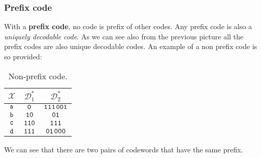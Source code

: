 \subsubsection{Prefix code}
With a \textbf{prefix code}, no code is prefix of other codes. Any prefix code is also a \textit{uniquely decodable code}.
As we can see also from the previous picture all the prefix codes are also unique decodable codes.
An example of a non prefix code is so provided:
\begin{table}[H]
	\centering
	\begin{tabular}{| c | c | c |}
		\hline
		$\mathcal{X}$ & $\mathcal{D}^*_1$ & $\mathcal{D}^*_2$\\\hline
		$\verb|a|$ & $\verb|0|$ & {\color{red}$\verb|111|$}$\verb|001|$ \\
		$\verb|b|$ & $\verb|10|$ & {\color{blue}$\verb|01|$} \\
		$\verb|c|$ & $\verb|110|$ & {\color{red}$\verb|111|$} \\
		$\verb|d|$ & $\verb|111|$ & {\color{blue}$\verb|01|$}$\verb|000|$ \\
		\hline
	\end{tabular}
	\caption{Non-prefix code.}
\end{table}
\par
We can see that there are two pairs of codewords that have the same prefix. 

